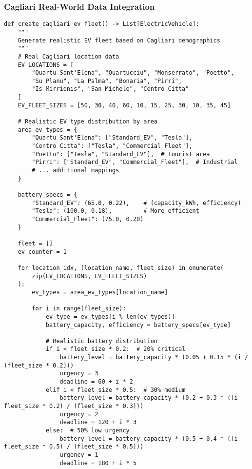 \documentclass[12pt,a4paper]{article}
\begin{document}
\subsubsection{Cagliari Real-World Data Integration}

\begin{lstlisting}[caption=Real-World Data Integration System,label=lst:cagliari]
def create_cagliari_ev_fleet() -> List[ElectricVehicle]:
    """
    Generate realistic EV fleet based on Cagliari demographics
    """
    # Real Cagliari location data
    EV_LOCATIONS = [
        "Quartu Sant'Elena", "Quartucciu", "Monserrato", "Poetto", 
        "Su Planu", "La Palma", "Bonaria", "Pirri", 
        "Is Mirrionis", "San Michele", "Centro Citta"
    ]
    EV_FLEET_SIZES = [50, 30, 40, 60, 10, 15, 25, 30, 10, 35, 45]
    
    # Realistic EV type distribution by area
    area_ev_types = {
        "Quartu Sant'Elena": ["Standard_EV", "Tesla"],
        "Centro Citta": ["Tesla", "Commercial_Fleet"],
        "Poetto": ["Tesla", "Standard_EV"],  # Tourist area
        "Pirri": ["Standard_EV", "Commercial_Fleet"],  # Industrial
        # ... additional mappings
    }
    
    battery_specs = {
        "Standard_EV": (65.0, 0.22),    # (capacity_kWh, efficiency)
        "Tesla": (100.0, 0.18),         # More efficient
        "Commercial_Fleet": (75.0, 0.20)
    }
    
    fleet = []
    ev_counter = 1
    
    for location_idx, (location_name, fleet_size) in enumerate(
        zip(EV_LOCATIONS, EV_FLEET_SIZES)
    ):
        ev_types = area_ev_types[location_name]
        
        for i in range(fleet_size):
            ev_type = ev_types[i % len(ev_types)]
            battery_capacity, efficiency = battery_specs[ev_type]
            
            # Realistic battery distribution
            if i < fleet_size * 0.2:  # 20% critical
                battery_level = battery_capacity * (0.05 + 0.15 * (i / (fleet_size * 0.2)))
                urgency = 3
                deadline = 60 + i * 2
            elif i < fleet_size * 0.5:  # 30% medium
                battery_level = battery_capacity * (0.2 + 0.3 * ((i - fleet_size * 0.2) / (fleet_size * 0.3)))
                urgency = 2
                deadline = 120 + i * 3
            else:  # 50% low urgency
                battery_level = battery_capacity * (0.5 + 0.4 * ((i - fleet_size * 0.5) / (fleet_size * 0.5)))
                urgency = 1
                deadline = 180 + i * 5
            

\end{lstlisting}
\end{document}

